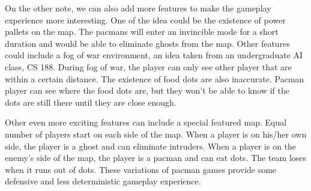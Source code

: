 \documentclass{acm_proc_article-sp}
\begin{document}
On the other note, we can also add more features to make the gameplay
experience more interesting. One of the idea could be the existence of
power pallets on the map. The pacmans will enter an invincible mode
for a short duration and would be able to eliminate ghosts from the
map. Other features could include a fog of war environment, an idea
taken from an undergraduate AI class, CS 188. During fog of war, the
player can only see other player that are within a certain
distance. The existence of food dots are also inaccurate. Pacman
player can see where the food dots are, but they won't be able to know
if the dots are still there until they are close enough. 

Other even more exciting features can include a special featured
map. Equal number of players start on each side of the map. When a
player is on his/her own side, the player is a ghost and can eliminate
intruders. When a player is on the enemy's side of the map, the player
is a pacman and can eat dots. The team loses when it runs out of
dots. These variations of pacman games provide some defensive and less
deterministic gameplay experience.




\end{document}
